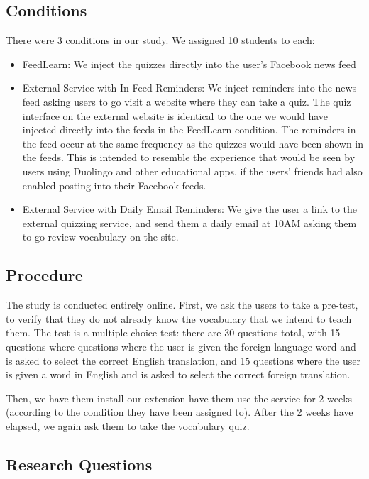 \documentclass{chi-ext}
\begin{document}
\subsection{Conditions}

There were 3 conditions in our study. We assigned 10 students to each:

\begin{itemize}
\item FeedLearn: We inject the quizzes directly into the user's Facebook news feed
\item External Service with In-Feed Reminders: We inject reminders into the news feed asking users to go visit a website where they can take a quiz. The quiz interface on the external website is identical to the one we would have injected directly into the feeds in the FeedLearn condition. The reminders in the feed occur at the same frequency as the quizzes would have been shown in the feeds. This is intended to resemble the experience that would be seen by users using Duolingo and other educational apps, if the users' friends had also enabled posting into their Facebook feeds.
\item External Service with Daily Email Reminders: We give the user a link to the external quizzing service, and send them a daily email at 10AM asking them to go review vocabulary on the site.
\end{itemize}

\subsection{Procedure}

The study is conducted entirely online. First, we ask the users to take a pre-test, to verify that they do not already know the vocabulary that we intend to teach them. The test is a multiple choice test: there are 30 questions total, with 15 questions where questions where the user is given the foreign-language word and is asked to select the correct English translation, and 15 questions where the user is given a word in English and is asked to select the correct foreign translation.

Then, we have them install our extension have them use the service for 2 weeks (according to the condition they have been assigned to). After the 2 weeks have elapsed, we again ask them to take the vocabulary quiz.

\subsection{Research Questions}
\end{document}
